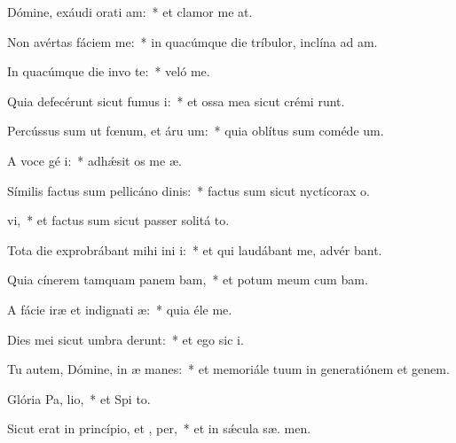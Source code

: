 \item Dómine, exáudi orati am:~* et clamor me   at.
\item Non avértas fáciem   me:~* in quacúmque die tríbulor, inclína ad   am.
\item In quacúmque die invo te:~* veló  me.
\item Quia defecérunt sicut fumus  i:~* et ossa mea sicut crémi runt.
\item Percússus sum ut fœnum, et áru  um:~* quia oblítus sum coméde  um.
\item A voce gé i:~* adhǽsit os me  æ.
\item Símilis factus sum pellicáno dinis:~* factus sum sicut nyctícorax  o.
\item {}vi,~* et factus sum sicut passer solitá  to.
\item Tota die exprobrábant mihi ini i:~* et qui laudábant me, advér  bant.
\item Quia cínerem tamquam panem bam,~* et potum meum cum  bam.
\item A fácie iræ et indignati æ:~* quia éle  me.
\item Dies mei sicut umbra derunt:~* et ego sic  i.
\item Tu autem, Dómine, in æ manes:~* et memoriále tuum in generatiónem et genem.
\item Glória Pa,  lio,~* et Spi to.
\item Sicut erat in princípio, et ,  per,~* et in sǽcula sæ. men.
